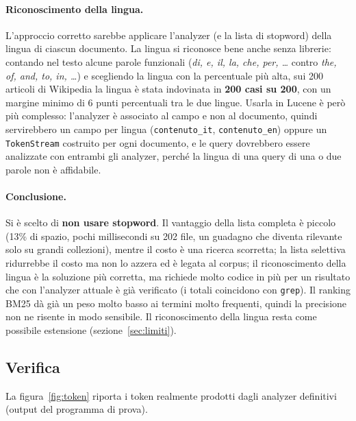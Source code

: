 \documentclass[11pt,a4paper]{article}
\newcommand{\code}[1]{\texttt{#1}}
\begin{document}
\paragraph{Riconoscimento della lingua.} L'approccio corretto sarebbe applicare
l'analyzer (e la lista di stopword) della lingua di ciascun documento. La lingua si
riconosce bene anche senza librerie: contando nel testo alcune parole funzionali
(\emph{di, e, il, la, che, per, \ldots} contro \emph{the, of, and, to, in, \ldots}) e
scegliendo la lingua con la percentuale più alta, sui 200 articoli di Wikipedia la
lingua è stata indovinata in \textbf{200 casi su 200}, con un margine minimo di 6
punti percentuali tra le due lingue. Usarla in Lucene è però più complesso: l'analyzer
è associato al campo e non al documento, quindi servirebbero un campo per lingua
(\code{contenuto\_it}, \code{contenuto\_en}) oppure un \code{TokenStream} costruito
per ogni documento, e le query dovrebbero essere analizzate con entrambi gli
analyzer, perché la lingua di una query di una o due parole non è affidabile.

\paragraph{Conclusione.} Si è scelto di \textbf{non usare stopword}. Il vantaggio
della lista completa è piccolo (13\% di spazio, pochi millisecondi su 202 file, un
guadagno che diventa rilevante solo su grandi collezioni), mentre il costo è una
ricerca scorretta; la lista selettiva ridurrebbe il costo ma non lo azzera ed è
legata al corpus; il riconoscimento della lingua è la soluzione più corretta, ma
richiede molto codice in più per un risultato che con l'analyzer attuale è già
verificato (i totali coincidono con \code{grep}). Il ranking BM25 dà già un peso
molto basso ai termini molto frequenti, quindi la precisione non ne risente in modo
sensibile. Il riconoscimento della lingua resta come possibile estensione
(sezione~\ref{sec:limiti}).

\subsection{Verifica}

La figura~\ref{fig:token} riporta i token realmente prodotti dagli analyzer
definitivi (output del programma di prova).
\end{document}
